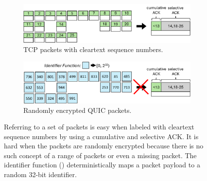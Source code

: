\begin{figure}[t]
    \centering
    \begin{subfigure}[b]{0.8\linewidth}
        \includegraphics[width=\linewidth]{slides/figures/ack_cleartext.pdf}
        \caption{TCP packets with cleartext sequence numbers.}
        \label{fig:slides:ack-example:cleartext}
    \end{subfigure}
    \begin{subfigure}[b]{0.8\linewidth}
        \includegraphics[width=\linewidth]{slides/figures/ack_encrypted.pdf}
        \caption{Randomly encrypted QUIC packets.}
        \label{fig:slides:ack-example:encrypted}
    \end{subfigure}
    \caption{Referring to a set of packets is easy when labeled with cleartext
    sequence numbers by using a cumulative and selective ACK. It is hard when
    the packets are randomly encrypted because there is no such concept of a
    range of packets or even a missing packet. The identifier function
    () deterministically
    maps a packet payload to a random 32-bit identifier.}
    \label{fig:slides:ack-example}
\end{figure}
